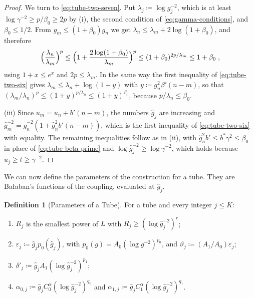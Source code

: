 \documentclass[11pt]{preprint}
\numberwithin{equation}{section}
\theoremstyle{definition}
\newtheorem{definition}[theorem]{Definition}
\theoremstyle{remark}
\theoremstyle{plain}
\begin{document}
\begin{proof}
We turn to \eqref{eq:tube-two-seven}. Put $\lambda_j \coloneqq \log g_j^{-2}$, which is at least $\log\gamma^{-2} \geq p/\beta_0 \geq 2p$ by (i), the second condition of \eqref{eq:gamma-conditions}, and $\beta_0 \leq 1/2$. From $g_m \leq (1 + \beta_0)g_n$ we get $\lambda_n \leq \lambda_m + 2\log(1 + \beta_0)$, and therefore
\begin{equation}\label{eq:tube-log-first}
    \Bigl(\frac{\lambda_n}{\lambda_m}\Bigr)^p \leq \Bigl(1 + \frac{2\log(1 + \beta_0)}{\lambda_m}\Bigr)^p \leq (1 + \beta_0)^{2p/\lambda_m} \leq 1 + \beta_0\;,
\end{equation}
using $1 + x \leq e^x$ and $2p \leq \lambda_m$. In the same way the first inequality of \eqref{eq:tube-two-six} gives $\lambda_m \leq \lambda_n + \log(1 + y)$ with $y \coloneqq g_n^2\beta'(n - m)$, so that $(\lambda_m/\lambda_n)^p \leq (1 + y)^{p/\lambda_n} \leq (1 + y)^{\beta_0}$, because $p/\lambda_n \leq \beta_0$.

(iii) Since $u_m = u_n + b'(n - m)$, the numbers $\hat g_j$ are increasing and $\hat g_m^{-2} = \hat g_n^{-2}(1 + \hat g_n^2b'(n - m))$, which is the first inequality of \eqref{eq:tube-two-six} with equality. The remaining inequalities follow as in (ii), with $\hat g_n^2b' \leq b^*\gamma^2 \leq \beta_0$ in place of \eqref{eq:tube-beta-prime} and $\log\hat g_j^{-2} \geq \log\gamma^{-2}$, which holds because $u_j \geq t \geq \gamma^{-2}$.
\end{proof}

We can now define the parameters of the construction for a tube. They are Ba{\l}aban's functions of the coupling, evaluated at $\hat g_j$.

\begin{definition}[Parameters of a Tube]\label{def:tube-parameters}
For a tube and every integer $j \leq K$:
\begin{enumerate}[label=(\roman*)]
\item $R_j$ is the smallest power of $L$ with $R_j \geq (\log\hat g_j^{-2})^r$;
\item $\varepsilon_j \coloneqq \hat g_jp_0(\hat g_j)$, with $p_0(g) = A_0(\log g^{-2})^{p_0}$, and $\vartheta_j \coloneqq (A_1/A_0)\varepsilon_j$;
\item $\delta'_j \coloneqq \hat g_jA_1(\log\hat g_j^{-2})^{p_1}$;
\item $\alpha_{0,j} \coloneqq \hat g_jC^\alpha_0(\log\hat g_j^{-2})^{q_0}$ and $\alpha_{1,j} \coloneqq \hat g_jC^\alpha_1(\log\hat g_j^{-2})^{q_1}$.
\end{enumerate}
\end{definition}
\end{document}
